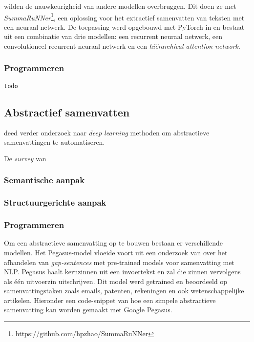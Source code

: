 
\textcite{Nallapati2017} wilden de nauwkeurigheid van andere modellen overbruggen. Dit doen ze met \textit{SummaRuNNer}\footnote{https://github.com/hpzhao/SummaRuNNer}, een oplossing voor het extractief samenvatten van teksten met een neuraal netwerk. De toepassing werd opgebouwd met PyTorch in  en bestaat uit een combinatie van drie modellen: een recurrent neuraal netwerk, een convolutioneel recurrent neuraal netwerk en een \textit{hiërarchical attention network}.

\subsubsection{Programmeren}

\begin{lstlisting}[language=Python]
todo
\end{lstlisting}

\subsection{Abstractief samenvatten}


\textcite{Cao2022} deed verder onderzoek naar \textit{deep learning} methoden om abstractieve samenvattingen te automatiseren. 

De \textit{survey} van 

\subsubsection{Semantische aanpak}

\subsubsection{Structuurgerichte aanpak}

\subsubsection{Programmeren}

Om een abstractieve samenvatting op te bouwen bestaan er verschillende modellen. Het Pegasus-model vloeide voort uit een onderzoek van \textcite{Zhang2020} over het afhandelen van \textit{gap-sentences} met pre-trained models voor samenvatting met NLP. Pegasus haalt kernzinnen uit een invoertekst en zal die zinnen vervolgens als één uitvoerzin uitschrijven. Dit model werd getrained en beoordeeld op samenvattingstaken zoals emails, patenten, rekeningen en ook wetenschappelijke artikelen. Hieronder een code-snippet van hoe een simpele abstractieve samenvatting kan worden gemaakt met Google Pegasus.

